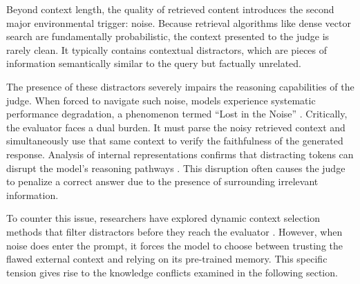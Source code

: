 Beyond context length, the quality of retrieved content introduces the second major environmental trigger: noise. Because retrieval algorithms like dense vector search are fundamentally probabilistic, the context presented to the judge is rarely clean. It typically contains contextual distractors, which are pieces of information semantically similar to the query but factually unrelated.

The presence of these distractors severely impairs the reasoning capabilities of the judge. When forced to navigate such noise, models experience systematic performance degradation, a phenomenon termed ``Lost in the Noise'' \citep{lostinnoise2026}. Critically, the evaluator faces a dual burden. It must parse the noisy retrieved context and simultaneously use that same context to verify the faithfulness of the generated response. Analysis of internal representations confirms that distracting tokens can disrupt the model's reasoning pathways \citep{internalrep2026}. This disruption often causes the judge to penalize a correct answer due to the presence of surrounding irrelevant information.

To counter this issue, researchers have explored dynamic context selection methods that filter distractors before they reach the evaluator \citep{dynamiccontext2025}. However, when noise does enter the prompt, it forces the model to choose between trusting the flawed external context and relying on its pre-trained memory. This specific tension gives rise to the knowledge conflicts examined in the following section.